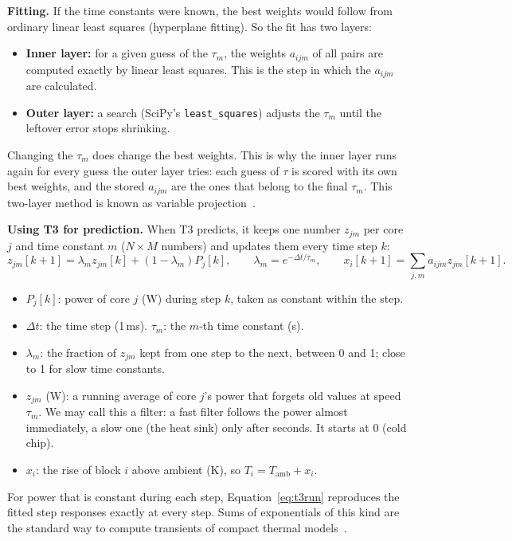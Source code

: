 \documentclass[11pt,a4paper]{article}
\begin{document}
\textbf{Fitting.} If the time constants were known, the best weights would follow from ordinary
linear least squares (hyperplane fitting). So the fit has two layers:
\begin{itemize}
  \item \textbf{Inner layer:} for a given guess of the $\tau_m$, the weights $a_{ijm}$ of all pairs
        are computed exactly by linear least squares. This is the step in which the $a_{ijm}$ are
        calculated.
  \item \textbf{Outer layer:} a search (SciPy's \texttt{least\_squares}) adjusts the $\tau_m$ until
        the leftover error stops shrinking.
\end{itemize}
Changing the $\tau_m$ does change the best weights. This is why the inner layer runs again for every
guess the outer layer tries: each guess of $\tau$ is scored with its own best weights, and the
stored $a_{ijm}$ are the ones that belong to the final $\tau_m$. This two-layer method is known as
variable projection~\cite{golub73}.

\textbf{Using T3 for prediction.} When T3 predicts, it keeps one number $z_{jm}$ per core $j$ and
time constant $m$ ($N \times M$ numbers) and updates them every time step $k$:
\begin{equation}
  z_{jm}[k+1] = \lambda_m z_{jm}[k] + (1-\lambda_m) P_j[k],\qquad \lambda_m = e^{-\Delta t/\tau_m},
  \qquad x_i[k+1] = \sum_{j,m} a_{ijm} z_{jm}[k+1].
  \label{eq:t3run}
\end{equation}
\begin{itemize}
  \item $P_j[k]$: power of core $j$ (W) during step $k$, taken as constant within the step.
  \item $\Delta t$: the time step (1\,ms). $\tau_m$: the $m$-th time constant (s).
  \item $\lambda_m$: the fraction of $z_{jm}$ kept from one step to the next, between 0 and 1;
        close to 1 for slow time constants.
  \item $z_{jm}$ (W): a running average of core $j$'s power that forgets old values at speed
        $\tau_m$. We may call this a filter: a fast filter follows the power almost immediately, a
        slow one (the heat sink) only after seconds. It starts at 0 (cold chip).
  \item $x_i$: the rise of block $i$ above ambient (K), so $T_i = T_\text{amb} + x_i$.
\end{itemize}
For power that is constant during each step, Equation~\eqref{eq:t3run} reproduces the fitted step
responses exactly at every step. Sums of exponentials of this kind are the standard way to compute
transients of compact thermal models~\cite{pagani15}.
\end{document}
